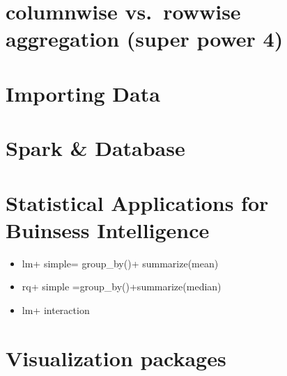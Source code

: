 \documentclass[
  letterpaper,
  DIV=11,
  numbers=noendperiod]{scrreprt}
\providecommand{\tightlist}{%
  \setlength{\itemsep}{0pt}\setlength{\parskip}{0pt}}\usepackage{longtable,booktabs,array}
\begin{document}

\section*{columnwise vs.~rowwise aggregation (super power
4)}\label{columnwise-vs.-rowwise-aggregation-super-power-4}


\section*{Importing Data}\label{importing-data}


\section*{Spark \& Database}\label{spark-database}


\section*{Statistical Applications for Buinsess
Intelligence}\label{statistical-applications-for-buinsess-intelligence}


\begin{itemize}
\tightlist
\item
  lm+ simple= group\_by()+ summarize(mean)
\item
  rq+ simple =group\_by()+summarize(median)
\item
  lm+ interaction
\end{itemize}

\section*{Visualization packages}\label{visualization-packages}

\end{document}
